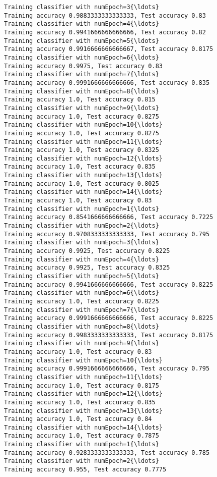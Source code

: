 \documentclass[11pt]{article}
\begin{document}
\begin{Verbatim}[commandchars=\\\{\}]
Training classifier with numEpoch=3{\ldots}
Training accuracy 0.9883333333333333, Test accuracy 0.83
Training classifier with numEpoch=4{\ldots}
Training accuracy 0.9941666666666666, Test accuracy 0.82
Training classifier with numEpoch=5{\ldots}
Training accuracy 0.9916666666666667, Test accuracy 0.8175
Training classifier with numEpoch=6{\ldots}
Training accuracy 0.9975, Test accuracy 0.83
Training classifier with numEpoch=7{\ldots}
Training accuracy 0.9991666666666666, Test accuracy 0.835
Training classifier with numEpoch=8{\ldots}
Training accuracy 1.0, Test accuracy 0.815
Training classifier with numEpoch=9{\ldots}
Training accuracy 1.0, Test accuracy 0.8275
Training classifier with numEpoch=10{\ldots}
Training accuracy 1.0, Test accuracy 0.8275
Training classifier with numEpoch=11{\ldots}
Training accuracy 1.0, Test accuracy 0.8325
Training classifier with numEpoch=12{\ldots}
Training accuracy 1.0, Test accuracy 0.835
Training classifier with numEpoch=13{\ldots}
Training accuracy 1.0, Test accuracy 0.8025
Training classifier with numEpoch=14{\ldots}
Training accuracy 1.0, Test accuracy 0.83
Training classifier with numEpoch=1{\ldots}
Training accuracy 0.8541666666666666, Test accuracy 0.7225
Training classifier with numEpoch=2{\ldots}
Training accuracy 0.9708333333333333, Test accuracy 0.795
Training classifier with numEpoch=3{\ldots}
Training accuracy 0.9925, Test accuracy 0.8225
Training classifier with numEpoch=4{\ldots}
Training accuracy 0.9925, Test accuracy 0.8325
Training classifier with numEpoch=5{\ldots}
Training accuracy 0.9941666666666666, Test accuracy 0.8225
Training classifier with numEpoch=6{\ldots}
Training accuracy 1.0, Test accuracy 0.8225
Training classifier with numEpoch=7{\ldots}
Training accuracy 0.9991666666666666, Test accuracy 0.8225
Training classifier with numEpoch=8{\ldots}
Training accuracy 0.9983333333333333, Test accuracy 0.8175
Training classifier with numEpoch=9{\ldots}
Training accuracy 1.0, Test accuracy 0.83
Training classifier with numEpoch=10{\ldots}
Training accuracy 0.9991666666666666, Test accuracy 0.795
Training classifier with numEpoch=11{\ldots}
Training accuracy 1.0, Test accuracy 0.8175
Training classifier with numEpoch=12{\ldots}
Training accuracy 1.0, Test accuracy 0.835
Training classifier with numEpoch=13{\ldots}
Training accuracy 1.0, Test accuracy 0.84
Training classifier with numEpoch=14{\ldots}
Training accuracy 1.0, Test accuracy 0.7875
Training classifier with numEpoch=1{\ldots}
Training accuracy 0.9283333333333333, Test accuracy 0.785
Training classifier with numEpoch=2{\ldots}
Training accuracy 0.955, Test accuracy 0.7775

\end{Verbatim}
\end{document}
